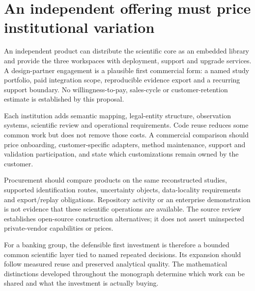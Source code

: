 \section{An independent offering must price institutional variation}
\label{r3:commercial-product}

An independent product can distribute the scientific core as an embedded
library and provide the three workspaces with deployment, support and
upgrade services. A design-partner engagement is a plausible first
commercial form: a named study portfolio, paid integration scope,
reproducible evidence export and a recurring support boundary.
No willingness-to-pay, sales-cycle or customer-retention estimate is
established by this proposal.

Each institution adds semantic mapping, legal-entity structure, observation
systems, scientific review and operational requirements. Code reuse
reduces some common work but does not remove those costs. A commercial
comparison should price onboarding, customer-specific adapters, method
maintenance, support and validation participation, and state which
customizations remain owned by the customer.

Procurement should compare products on the same reconstructed studies,
supported identification routes, uncertainty objects, data-locality
requirements and export/replay obligations. Repository activity or an
enterprise demonstration is not evidence that these scientific
operations are available. The source review establishes open-source
construction alternatives; it does not assert uninspected private-vendor
capabilities or prices.

For a banking group, the defensible first investment is therefore a
bounded common scientific layer tied to named repeated decisions.
Its expansion should follow measured reuse and preserved analytical
quality. The mathematical distinctions developed throughout the
monograph determine which work can be shared and what the investment
is actually buying.
